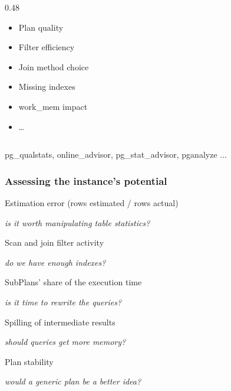 \documentclass{beamer}
\begin{document}
\begin{frame}
\begin{columns}[T]
\begin{column}{0.48\textwidth}
\begin{tcolorbox}[enhanced, arc=3pt, colback=paper, colframe=ptoaccent,
					  boxrule=0.4pt, left=6pt, right=6pt, top=5pt, bottom=5pt,
					  before skip=2pt, after skip=0pt, equal height group=qtv]
\smallskip
{\ttfamily\scriptsize\color{ptoink}
  \begin{itemize}
    \item Plan quality
    \item Filter efficiency
    \item Join method choice
    \item Missing indexes
    \item work\_mem impact
    \item \ldots
  \end{itemize}
}

    \end{tcolorbox}
  \end{column}
\end{columns}
\vfill
pg\_qualstats, online\_advisor, pg\_stat\_advisor, pganalyze ...
\vfill
\end{frame}


\newcommand{\lever}[3]{%
  \noindent\makebox[0.8cm][l]{\large\bfseries\textcolor{ptoaccent}{#1}}%
  {\large\color{ptoink}#2}\par
  \vspace{1pt}
  \noindent\hspace{0.8cm}\parbox[t]{\dimexpr\linewidth-0.8cm\relax}{%
    \raggedright\small\itshape\textcolor{black!55}{#3}}\par
  \vspace{7pt}}

\begin{frame}\frametitle{Assessing the instance's potential}
\vspace*{\fill}

\lever{1}{Estimation error (rows estimated / rows actual)}
  {is it worth manipulating table statistics?}
\lever{2}{Scan and join filter activity}
  {do we have enough indexes?}
\lever{3}{SubPlans' share of the execution time}
  {is it time to rewrite the queries?}
\lever{4}{Spilling of intermediate results}
  {should queries get more memory?}
\lever{5}{Plan stability}
  {would a generic plan be a better idea?}

\vspace*{\fill}
\end{frame}
\end{document}
